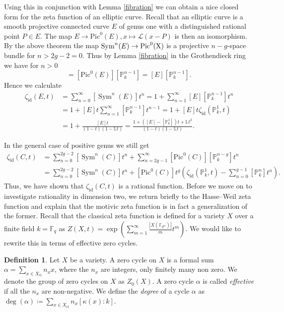 \documentclass[11pt, a4paper, english, twoside]{article}
\theoremstyle{plain}
\theoremstyle{definition}
\newtheorem{definition}[theorem]{Definition}
\DeclareMathOperator{\Sym}{Sym}
\begin{document}
Using this in conjunction with Lemma \ref{fibration} we can obtain a nice closed form for the zeta function of an elliptic curve.
Recall that an elliptic curve is a smooth projective connected curve $E$ of genus one with a distinguished rational point $P \in E$. The
map $E \to \mathrm{Pic}^0(E), x \mapsto \mathcal{L}(x-P)$ is then an isomorphism. By the above theorem the map $\Sym^n(E) \to \rm{Pic}^0(X)$ is a projective $n-g$-space
bundle for
$n > 2g - 2 = 0$. 
Thus by Lemma \ref{fibration} in the Grothendieck ring we have for $n>0$ 
\begin{equation}
    [\Sym^n(E)] = [\mathrm{Pic}^0(E)][\mathbb{P}_k^{n-1}] = [E][\mathbb{P}_k^{n-1}].
\end{equation}
Hence we calculate
\begin{align*}
    \zeta_{\mathrm{id}}(E,t) &= \sum_{n=0}^{\infty} [\Sym^n(E)]t^n = 1 + \sum_{n=1}^\infty [E][\mathbb{P}_k^{n-1}]t^n \\
                             &= 1 + [E]t \sum_{n=1}^\infty[\mathbb{P}_k^{n-1}]t^{n-1} = 1 + [E]t \zeta_{\mathrm{id}}(\mathbb{P}_k^1, t)\\
                             &= 1 + \frac{[E]t}{(1-t)(1-\mathbb{L}t)} = \frac{1 + ([E]-[\mathbb{P}_k^1])t + \mathbb{L}t^2}{(1-t)(1-\mathbb{L}t)}.
\end{align*}

In the general case of positive genus we still get
\begin{align*}
    \zeta_{\mathrm{id}}(C,t) &= \sum_{n=0}^{2g-2} [\Sym^n(C)]t^n + \sum_{n=2g-1}^\infty [\mathrm{Pic}^0(C)][\mathbb{P}_k^{n-g}]t^n\\
                             &= \sum_{n=0}^{2g-2} [\Sym^n(C)]t^n + [\mathrm{Pic}^0(C)]t^g(\zeta_{\mathrm{id}}(\mathbb{P}_k^1, t) - \sum_{n=0}^{g-1} [\mathbb{P}_k^n]t^n).
\end{align*}
Thus, we have shown that $\zeta_{\mathrm{id}}(C,t)$ is a rational function.
Before we move on to investigate rationality in dimension two, we return briefly to the Hasse--Weil zeta function and explain that the 
motivic zeta function is in fact a generalization of the former.
Recall that the classical zeta function is defined for a variety $X$ over a finite field $k = \mathbb{F}_q$ as 
$Z(X,t) = \exp\left(\sum_{m=1}^\infty \frac{|X(\mathbb{F}_{q^m})|}{m}t^m\right)$. We would like to rewrite this in terms of effective zero cycles.
\begin{definition}
    Let $X$ be a variety. A zero cycle on $X$ is a formal sum $\alpha = \sum_{x \in X_\mathrm{cl}} n_x x$, where the $n_x$ are integers,
    only finitely many non zero. We denote the group of zero cycles on $X$ as $Z_0(X)$. A zero cycle $\alpha$ is called
    \emph{effective} if all the $n_x$ are non-negative. We define the \emph{degree} of a cycle $\alpha$ as 
    $\deg(\alpha) \coloneqq \sum_{x \in X_{\mathrm{cl}}} n_x [\kappa(x):k]$.
\end{definition}
\end{document}

